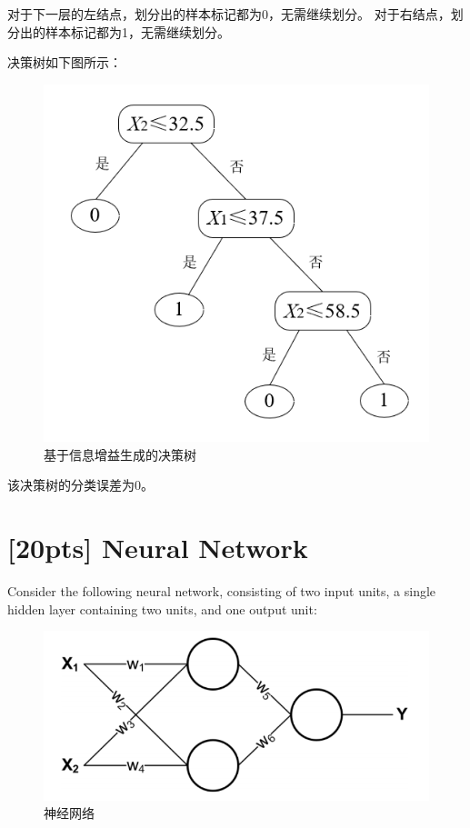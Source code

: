\documentclass[a4paper,utf8]{article}
\begin{document}
	对于下一层的左结点，划分出的样本标记都为0，无需继续划分。
	对于右结点，划分出的样本标记都为1，无需继续划分。

	决策树如下图所示：
	\begin{figure}[H]
		\centering
		\includegraphics[scale=0.7]{p1-dt2.PNG}
		\caption{基于信息增益生成的决策树}
	\end{figure}

	该决策树的分类误差为0。
	



	\newpage
	\section{[20pts] Neural Network}
	\noindent Consider the following neural network, consisting of two input units, a single hidden layer containing two units, and one output unit:
	
	\begin{figure}[htbp]
		\centering
		\includegraphics[scale=0.5]{p2-nn1.png}
		\caption{神经网络}
	\end{figure}
\end{document}
